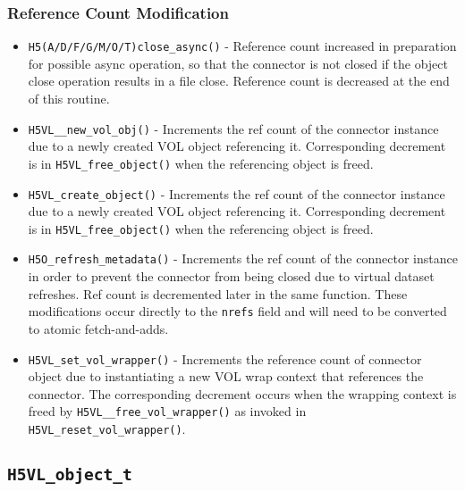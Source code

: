 \subsubsection{Reference Count Modification}
\begin{itemize}
    \item \texttt{H5(A/D/F/G/M/O/T)close\_async()} - Reference count increased in preparation for possible async operation, so that the connector is not closed if the object close operation results in a file close. Reference count is decreased at the end of this routine.

    \item \texttt{H5VL\_\_new\_vol\_obj()} - Increments the ref count of the connector instance due to a newly created VOL object referencing it. Corresponding decrement is in \texttt{H5VL\_free\_object()} when the referencing object is freed.

    \item \texttt{H5VL\_create\_object()} - Increments the ref count of the connector instance due to a newly created VOL object referencing it. Corresponding decrement is in \texttt{H5VL\_free\_object()} when the referencing object is freed.

    \item \texttt{H5O\_refresh\_metadata()} - Increments the ref count of the connector instance in order to prevent the connector from being closed due to virtual dataset refreshes. Ref count is decremented later in the same function. These modifications occur directly to the \texttt{nrefs} field and will need to be converted to atomic fetch-and-adds.

    \item \texttt{H5VL\_set\_vol\_wrapper()} - Increments the reference count of connector object due to instantiating a new VOL wrap context that references the connector. The corresponding decrement occurs when the wrapping context is freed by \texttt{H5VL\_\_free\_vol\_wrapper()} as invoked in \texttt{H5VL\_reset\_vol\_wrapper()}.


\end{itemize}

\subsection{\texttt{H5VL\_object\_t}}

